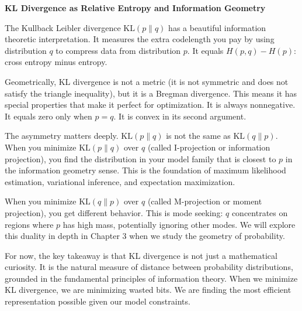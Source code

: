 \begin{geometrylens}
\textbf{KL Divergence as Relative Entropy and Information Geometry}

\vspace{0.5em}

The Kullback Leibler divergence $\text{KL}(p \| q)$ has a beautiful information theoretic interpretation. It measures the extra codelength you pay by using distribution $q$ to compress data from distribution $p$. It equals $H(p, q) - H(p)$: cross entropy minus entropy.

\vspace{0.5em}

Geometrically, KL divergence is not a metric (it is not symmetric and does not satisfy the triangle inequality), but it is a Bregman divergence. This means it has special properties that make it perfect for optimization. It is always nonnegative. It equals zero only when $p = q$. It is convex in its second argument.

\vspace{0.5em}

The asymmetry matters deeply. $\text{KL}(p \| q)$ is not the same as $\text{KL}(q \| p)$. When you minimize $\text{KL}(p \| q)$ over $q$ (called I-projection or information projection), you find the distribution in your model family that is closest to $p$ in the information geometry sense. This is the foundation of maximum likelihood estimation, variational inference, and expectation maximization.

\vspace{0.5em}

When you minimize $\text{KL}(q \| p)$ over $q$ (called M-projection or moment projection), you get different behavior. This is mode seeking: $q$ concentrates on regions where $p$ has high mass, potentially ignoring other modes. We will explore this duality in depth in Chapter 3 when we study the geometry of probability.

\vspace{0.5em}

For now, the key takeaway is that KL divergence is not just a mathematical curiosity. It is the natural measure of distance between probability distributions, grounded in the fundamental principles of information theory. When we minimize KL divergence, we are minimizing wasted bits. We are finding the most efficient representation possible given our model constraints.
\end{geometrylens}

\vspace{1.5em}

